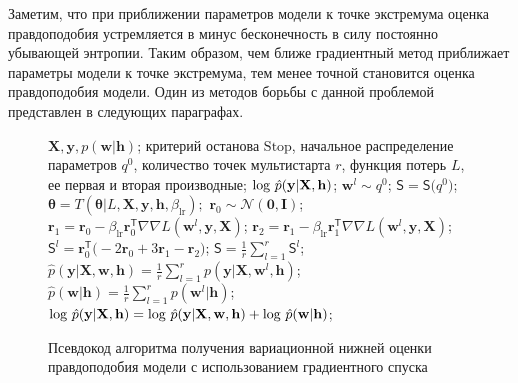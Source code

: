 Заметим, что при приближении параметров модели к точке экстремума оценка правдоподобия устремляется в минус бесконечность в силу постоянно убывающей энтропии. Таким образом, чем ближе градиентный метод приближает параметры модели к точке экстремума, тем менее точной становится оценка правдоподобия модели. Один из методов борьбы с данной проблемой представлен в следующих параграфах.
\begin{figure}
\begin{algorithmic}[1]
\REQUIRE $\mathbf{X}, \mathbf{y}, p(\mathbf{w}|\mathbf{h})$;
\REQUIRE критерий останова $\text{Stop}$, начальное распределение параметров $q^0$, количество точек мультистарта $r$, функция потерь $L$, ее первая и вторая производные;
\ENSURE $\textnormal{log}~\hat{p}(\mathbf{y}|\mathbf{X}, \mathbf{h})$;
\STATE $\mathbf{w}^l \sim q^0$;
\ENDFOR
\STATE $\mathsf{S} = \mathsf{S}\bigl(q^0)$;
\STATE $\boldsymbol{\theta} = T( \boldsymbol{\theta}| L,\mathbf{X},  \mathbf{y},  \mathbf{h}, {\beta_{\text{lr}}});$
\STATE $\mathbf{r}_0 \sim \mathcal{N}(\mathbf{0}, \mathbf{I})$;
\STATE $\mathbf{r}_1 = \mathbf{r}_0 - \beta_{\text{lr}} \mathbf{r}^{\mathsf{T}}_0 \nabla \nabla L(\mathbf{w}^l, \mathbf{y}, \mathbf{X})$;
\STATE $\mathbf{r}_2 = \mathbf{r}_1 - \beta_{\text{lr}} \mathbf{r}^{\mathsf{T}}_1 \nabla \nabla L(\mathbf{w}^l, \mathbf{y}, \mathbf{X})$;
\STATE $\mathsf{S}^l = \mathbf{r}_0^\mathsf{T}\bigl(-2\mathbf{r}_0 + 3\mathbf{r}_1 -\mathbf{r}_2\bigr)$;
\ENDFOR
\STATE $\mathsf{S} = \frac{1}{r}\sum_{l=1}^r \mathsf{S}^l$;
\ENDWHILE
\STATE $\hat{p}(\mathbf{y}|\mathbf{X}, \mathbf{w}, \mathbf{h}) = \frac{1}{r}\sum_{l=1}^r p(\mathbf{y}|\mathbf{X}, \mathbf{w}^l, \mathbf{h})$;
\STATE $\hat{p}(\mathbf{w} | \mathbf{h}) = \frac{1}{r}\sum_{l=1}^r p(\mathbf{w}^l| \mathbf{h})$;
\STATE $\textnormal{log}~\hat{p}(\mathbf{y}|\mathbf{X}, \mathbf{h}) = \textnormal{log}~\hat{p}(\mathbf{y}|\mathbf{X}, \mathbf{w}, \mathbf{h}) +\textnormal{log}~\hat{p}(\mathbf{w} | \mathbf{h})$;
	
\end{algorithmic}
\caption{Псевдокод алгоритма получения вариационной нижней оценки правдоподобия модели с использованием градиентного спуска}
\label{fig:algo}

\end{figure}



